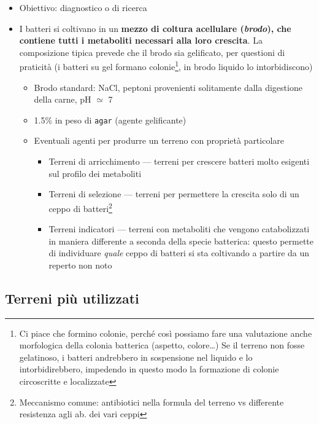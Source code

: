 \documentclass[italian,]{article}
\providecommand{\tightlist}{%
  \setlength{\itemsep}{0pt}\setlength{\parskip}{0pt}}
\begin{document}
\begin{itemize}
\tightlist
\item
  Obiettivo: diagnostico o di ricerca
\item
  I batteri si coltivano in un \textbf{mezzo di coltura acellulare
  (\emph{brodo}), che contiene tutti i metaboliti necessari alla loro
  crescita}. La composizione tipica prevede che il brodo sia gelificato,
  per questioni di praticità (i batteri su gel formano colonie\footnote{Ci
    piace che formino colonie, perché così possiamo fare una valutazione
    anche morfologica della colonia batterica (aspetto, colore\ldots{})
    Se il terreno non fosse gelatinoso, i batteri andrebbero in
    sospensione nel liquido e lo intorbidirebbero, impedendo in questo
    modo la formazione di colonie circoscritte e localizzate}, in brodo
  liquido lo intorbidiscono)

  \begin{itemize}
  \tightlist
  \item
    Brodo standard: NaCl, peptoni provenienti solitamente dalla
    digestione della carne, pH \(\simeq\) 7
  \item
    1.5\% in peso di \texttt{agar} (agente gelificante)
  \item
    Eventuali agenti per produrre un terreno con proprietà particolare

    \begin{itemize}
    \tightlist
    \item
      Terreni di arricchimento --- terreni per crescere batteri molto
      esigenti sul profilo dei metaboliti
    \item
      Terreni di selezione --- terreni per permettere la crescita solo
      di un ceppo di batteri\footnote{Meccanismo comune: antibiotici
        nella formula del terreno vs differente resistenza agli ab. dei
        vari ceppi}
    \item
      Terreni indicatori --- terreni con metaboliti che vengono
      catabolizzati in maniera differente a seconda della specie
      batterica: questo permette di individuare \emph{quale} ceppo di
      batteri si sta coltivando a partire da un reperto non noto
    \end{itemize}
  \end{itemize}
\end{itemize}

\hypertarget{terreni-piuxf9-utilizzati}{%
\subsection{Terreni più utilizzati}\label{terreni-piuxf9-utilizzati}}
\end{document}
